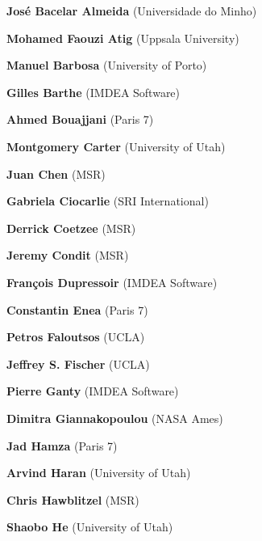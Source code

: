 \documentclass{article}
\begin{document}
  \begin{commalist}

    \item {\bf José Bacelar Almeida} (Universidade do Minho)


    \item {\bf Mohamed Faouzi Atig} (Uppsala University)


    \item {\bf Manuel Barbosa} (University of Porto)


    \item {\bf Gilles Barthe} (IMDEA Software)


    \item {\bf Ahmed Bouajjani} (Paris 7)


    \item {\bf Montgomery Carter} (University of Utah)


    \item {\bf Juan Chen} (MSR)


    \item {\bf Gabriela Ciocarlie} (SRI International)


    \item {\bf Derrick Coetzee} (MSR)


    \item {\bf Jeremy Condit} (MSR)


    \item {\bf François Dupressoir} (IMDEA Software)


    \item {\bf Constantin Enea} (Paris 7)


    \item {\bf Petros Faloutsos} (UCLA)


    \item {\bf Jeffrey S. Fischer} (UCLA)


    \item {\bf Pierre Ganty} (IMDEA Software)


    \item {\bf Dimitra Giannakopoulou} (NASA Ames)


    \item {\bf Jad Hamza} (Paris 7)


    \item {\bf Arvind Haran} (University of Utah)


    \item {\bf Chris Hawblitzel} (MSR)


    \item {\bf Shaobo He} (University of Utah)



\end{commalist}
\end{document}
